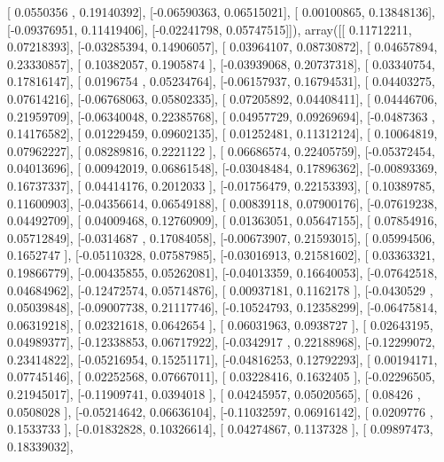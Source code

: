 \documentclass{article}
\begin{document}
       [ 0.0550356 ,  0.19140392],
       [-0.06590363,  0.06515021],
       [ 0.00100865,  0.13848136],
       [-0.09376951,  0.11419406],
       [-0.02241798,  0.05747515]]), array([[ 0.11712211,  0.07218393],
       [-0.03285394,  0.14906057],
       [ 0.03964107,  0.08730872],
       [ 0.04657894,  0.23330857],
       [ 0.10382057,  0.1905874 ],
       [-0.03939068,  0.20737318],
       [ 0.03340754,  0.17816147],
       [ 0.0196754 ,  0.05234764],
       [-0.06157937,  0.16794531],
       [ 0.04403275,  0.07614216],
       [-0.06768063,  0.05802335],
       [ 0.07205892,  0.04408411],
       [ 0.04446706,  0.21959709],
       [-0.06340048,  0.22385768],
       [ 0.04957729,  0.09269694],
       [-0.0487363 ,  0.14176582],
       [ 0.01229459,  0.09602135],
       [ 0.01252481,  0.11312124],
       [ 0.10064819,  0.07962227],
       [ 0.08289816,  0.2221122 ],
       [ 0.06686574,  0.22405759],
       [-0.05372454,  0.04013696],
       [ 0.00942019,  0.06861548],
       [-0.03048484,  0.17896362],
       [-0.00893369,  0.16737337],
       [ 0.04414176,  0.2012033 ],
       [-0.01756479,  0.22153393],
       [ 0.10389785,  0.11600903],
       [-0.04356614,  0.06549188],
       [ 0.00839118,  0.07900176],
       [-0.07619238,  0.04492709],
       [ 0.04009468,  0.12760909],
       [ 0.01363051,  0.05647155],
       [ 0.07854916,  0.05712849],
       [-0.0314687 ,  0.17084058],
       [-0.00673907,  0.21593015],
       [ 0.05994506,  0.1652747 ],
       [-0.05110328,  0.07587985],
       [-0.03016913,  0.21581602],
       [ 0.03363321,  0.19866779],
       [-0.00435855,  0.05262081],
       [-0.04013359,  0.16640053],
       [-0.07642518,  0.04684962],
       [-0.12472574,  0.05714876],
       [ 0.00937181,  0.1162178 ],
       [-0.0430529 ,  0.05039848],
       [-0.09007738,  0.21117746],
       [-0.10524793,  0.12358299],
       [-0.06475814,  0.06319218],
       [ 0.02321618,  0.0642654 ],
       [ 0.06031963,  0.0938727 ],
       [ 0.02643195,  0.04989377],
       [-0.12338853,  0.06717922],
       [-0.0342917 ,  0.22188968],
       [-0.12299072,  0.23414822],
       [-0.05216954,  0.15251171],
       [-0.04816253,  0.12792293],
       [ 0.00194171,  0.07745146],
       [ 0.02252568,  0.07667011],
       [ 0.03228416,  0.1632405 ],
       [-0.02296505,  0.21945017],
       [-0.11909741,  0.0394018 ],
       [ 0.04245957,  0.05020565],
       [ 0.08426   ,  0.0508028 ],
       [-0.05214642,  0.06636104],
       [-0.11032597,  0.06916142],
       [ 0.0209776 ,  0.1533733 ],
       [-0.01832828,  0.10326614],
       [ 0.04274867,  0.1137328 ],
       [ 0.09897473,  0.18339032],
\end{document}
